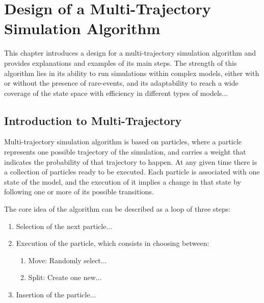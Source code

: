 
\chapter{Design of a Multi-Trajectory Simulation Algorithm} 
\label{ch:Multi-Trajectory Simulation Algorithm}
This chapter introduces a design for a multi-trajectory simulation algorithm and provides explanations and examples of its main steps. The strength of this algorithm lies in its ability to run simulations within complex models, either with or without the presence of rare-events, and its adaptability to reach a wide coverage of the state space with efficiency in different types of models...

\section{Introduction to Multi-Trajectory}
\label{sec:Introduction to Multi-Trajectory}
Multi-trajectory simulation algorithm is based on particles, where a particle represents one possible trajectory of the simulation, and carries a weight that indicates the probability of that trajectory to happen. At any given time there is a collection of particles ready to be executed. Each particle is associated with one state of the model, and the execution of it implies a change in that state by following one or more of its possible transitions. 

The core idea of the algorithm can be described as a loop of three steps:
\begin{enumerate}
  \item Selection of the next particle...
  \item Execution of the particle, which consists in choosing between:
  \begin{enumerate}
    \item Move: Randomly select...
    \item Split: Create one new...
  \end{enumerate}
  \item Insertion of the particle...
\end{enumerate}



